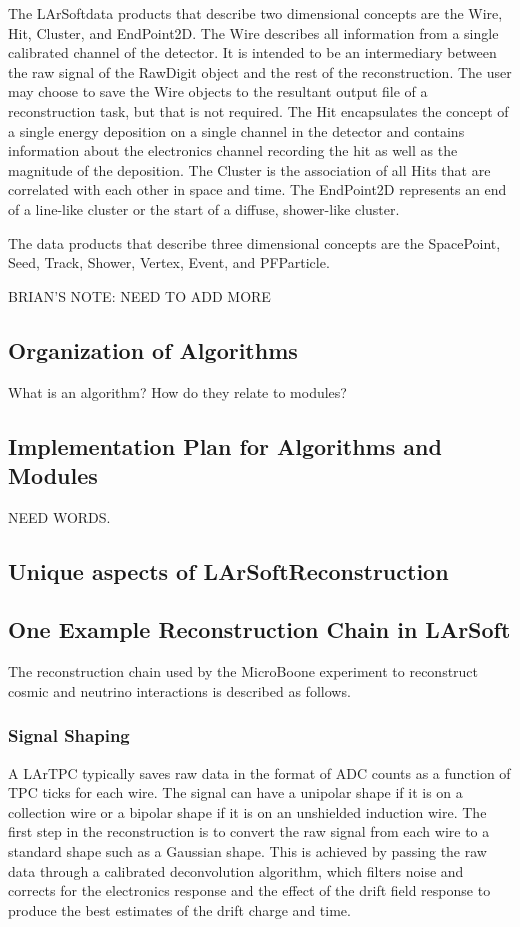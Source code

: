 \documentclass[12pt]{elsarticle}
\newcommand{\larsoft}{LArSoft}
\begin{document}
The \larsoft data products that describe two dimensional concepts are the Wire, Hit, Cluster, and EndPoint2D.  The Wire describes all information from a single calibrated channel of the detector.  It is intended to be an intermediary between the raw signal of the RawDigit object and the rest of the reconstruction.  The user may choose to save the Wire objects to the resultant output file of a reconstruction task, but that is not required.  The Hit encapsulates the concept of a single energy deposition on a single channel in the detector and contains information about the electronics channel recording the hit as well as the magnitude of the deposition.  The Cluster is the association of all Hits that are correlated with each other in space and time.  The EndPoint2D represents an end of a line-like cluster or the start of a diffuse, shower-like cluster.

The data products that describe three dimensional concepts are the SpacePoint, Seed, Track, Shower, Vertex, Event, and PFParticle. 
 
BRIAN'S NOTE: NEED TO ADD MORE 

\subsection{Organization of Algorithms}

What is an algorithm? How do they relate to modules?

\subsection{Implementation Plan for Algorithms and Modules}
NEED WORDS.

\subsection{Unique aspects of \larsoft Reconstruction}

\subsection{One Example Reconstruction Chain in \larsoft}
The reconstruction chain used by the MicroBoone experiment to reconstruct cosmic and neutrino interactions is described as follows.

\subsubsection{Signal Shaping}
A LArTPC typically saves raw data in the format of ADC counts as a function of TPC ticks for each wire. The signal can have a unipolar shape if it is on a collection wire or a bipolar shape if it is on an unshielded induction wire. The first step in the reconstruction is to convert the raw signal from each wire to a standard shape such as a Gaussian shape. This is achieved by passing the raw data through a calibrated deconvolution algorithm, which filters noise and corrects for the electronics response and the effect of the drift field response to produce the best estimates of the drift charge and time. 
\end{document}
